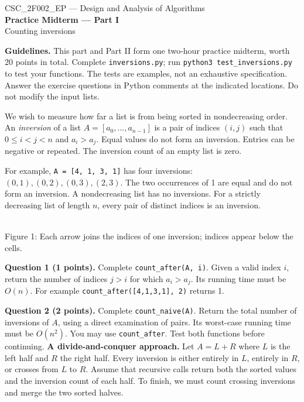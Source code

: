 \documentclass[11pt,a4paper]{article}
\newcommand{\code}[1]{\texttt{#1}}
\newcommand{\q}[2]{\medskip\noindent\textbf{Question #1 (#2 points).} }
\begin{document}
\begin{center}{\large CSC\_2F002\_EP --- Design and Analysis of Algorithms}\\[3pt]
{\Large\bfseries Practice Midterm --- Part I}\\[3pt]{\large Counting inversions}\end{center}
\textbf{Guidelines.} This part and Part II form one two-hour practice midterm, worth 20 points in total. Complete \code{inversions.py}; run \code{python3 test\_inversions.py} to test your functions. The tests are examples, not an exhaustive specification. Answer the exercise questions in Python comments at the indicated locations. Do not modify the input lists.

We wish to measure how far a list is from being sorted in nondecreasing order. An \emph{inversion} of a list \(A=[a_0,\ldots,a_{n-1}]\) is a pair of indices \((i,j)\) such that \(0\le i<j<n\) and \(a_i>a_j\). Equal values do not form an inversion. Entries can be negative or repeated. The inversion count of an empty list is zero.

For example, \code{A = [4, 1, 3, 1]} has four inversions: \((0,1), (0,2), (0,3), (2,3)\). The two occurrences of 1 are equal and do not form an inversion. A nondecreasing list has no inversions. For a strictly decreasing list of length \(n\), every pair of distinct indices is an inversion.
\begin{center}\\[4pt]\small Figure 1: Each arrow joins the indices of one inversion; indices appear below the cells.\end{center}
\q{1}{1} Complete \code{count\_after(A, i)}. Given a valid index \(i\), return the number of indices \(j>i\) for which \(a_i>a_j\). Its running time must be \(O(n)\). For example \code{count\_after([4,1,3,1], 2)} returns 1.

\q{2}{2} Complete \code{count\_naive(A)}. Return the total number of inversions of \(A\), using a direct examination of pairs. Its worst-case running time must be \(O(n^2)\). You may use \code{count\_after}. Test both functions before continuing.
\newpage
\textbf{A divide-and-conquer approach.} Let \(A=L+R\) where \(L\) is the left half and \(R\) the right half. Every inversion is either entirely in \(L\), entirely in \(R\), or crosses from \(L\) to \(R\). Assume that recursive calls return both the sorted values and the inversion count of each half. To finish, we must count crossing inversions and merge the two sorted halves.
\end{document}
